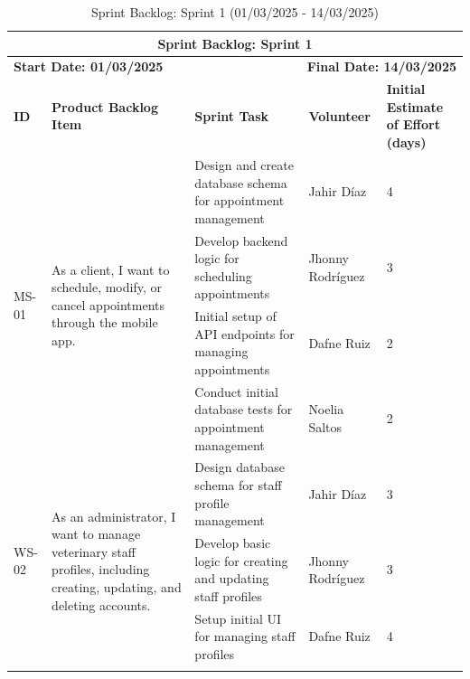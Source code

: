 \documentclass[a4paper,12pt]{report}
\begin{document}
	\begin{longtable}{|p{2cm}|p{4cm}|p{5cm}|p{3cm}|p{2cm}|} 
		\hline
		\multicolumn{5}{|c|}{\textbf{Sprint Backlog: Sprint 1}} \\
		\hline
		\multicolumn{2}{|l|}{\textbf{Start Date: 01/03/2025}} & \multicolumn{3}{r|}{\textbf{Final Date: 14/03/2025}} \\
		\hline
		\textbf{ID} & \textbf{Product Backlog Item} & \textbf{Sprint Task} & \textbf{Volunteer} & \textbf{Initial Estimate of Effort (days)} \\
		\hline
		\multirow{4}{*}{MS-01} 
		& \multirow{4}{4cm}{As a client, I want to schedule, modify, or cancel appointments through the mobile app.}
		& Design and create database schema for appointment management & Jahir Díaz & 4 \\
		\cline{3-5}
		& & Develop backend logic for scheduling appointments & Jhonny Rodríguez & 3 \\
		\cline{3-5}
		& & Initial setup of API endpoints for managing appointments & Dafne Ruiz & 2 \\
		\cline{3-5}
		& & Conduct initial database tests for appointment management & Noelia Saltos & 2 \\
		\hline
		\multirow{3}{*}{WS-02}
		& \multirow{3}{4cm}{As an administrator, I want to manage veterinary staff profiles, including creating, updating, and deleting accounts.}
		& Design database schema for staff profile management & Jahir Díaz & 3 \\
		\cline{3-5}
		& & Develop basic logic for creating and updating staff profiles & Jhonny Rodríguez & 3 \\
		\cline{3-5}
		& & Setup initial UI for managing staff profiles & Dafne Ruiz & 4 \\
		\hline
		\caption{Sprint Backlog: Sprint 1 (01/03/2025 - 14/03/2025)}
	\end{longtable}
	
	
\end{document}
